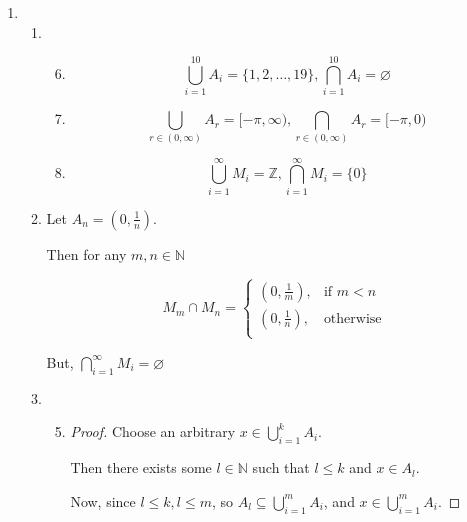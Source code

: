 \documentclass[12pt,letterpaper]{article}
\begin{document}
\begin{enumerate}
\begin{enumerate}
\begin{enumerate}
          \end{enumerate}
      \end{enumerate}
    \item
      \begin{enumerate}
        \item
          \begin{enumerate}
            \setcounter{enumiii}{5}
            \item
              \[
                \bigcup_{i = 1}^{10} A_i = \{1, 2, \dots, 19\}
              ,
                \bigcap_{i = 1}^{10} A_i = \varnothing
              \]
            \setcounter{enumiii}{7}
            \item
              \[
                \bigcup_{r \in (0, \infty)} A_r = [-\pi, \infty)
              ,
                \bigcap_{r \in (0, \infty)} A_r = [-\pi, 0)
              \]
            \setcounter{enumiii}{9}
            \item
              \[
                \bigcup_{i = 1}^{\infty} M_i = \mathbb{Z}
              ,
                \bigcap_{i = 1}^{\infty} M_i = \{0\}
              \]
          \end{enumerate}
        \setcounter{enumii}{11}
        \item
          Let $A_n = (0, \frac{1}{n})$.

          Then for any $m, n \in \mathbb{N}$

          \[
            M_m \cap M_n
            =
            \begin{cases}
              \left(0, \frac{1}{m}\right), & \mbox{if } m < n \\
              \left(0, \frac{1}{n}\right), & \mbox{otherwise} \\
            \end{cases}
          \]

          But, $\bigcap_{i = 1}^{\infty} M_i = \varnothing$
        \setcounter{enumii}{14}
        \item
          \begin{enumerate}
            \setcounter{enumiii}{4}
            \item
              \begin{proof}
                Choose an arbitrary $x \in \bigcup\limits_{i = 1}^k A_i$.

                Then there exists some $l \in \mathbb{N}$ such that $l \leq k$ and $x \in A_l$.

                Now, since $l \leq k, l \leq m$, so $A_l \subseteq \bigcup\limits_{i = 1}^m A_i$,
                and $x \in \bigcup\limits_{i = 1}^m A_i$.


\end{proof}
\end{enumerate}
\end{enumerate}
\end{enumerate}
\end{document}
